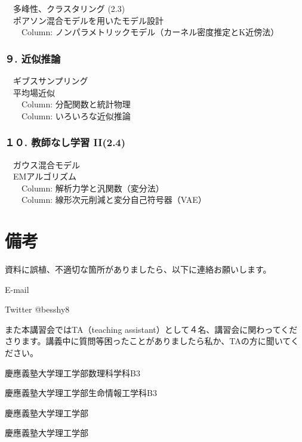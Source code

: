 \documentclass[
]{ltjarticle}
\begin{document}
　多峰性、クラスタリング (2.3)\\
　ポアソン混合モデルを用いたモデル設計\\
　　Column: ノンパラメトリックモデル（カーネル密度推定とK近傍法）

\hypertarget{ux8fd1ux4f3cux63a8ux8ad6}{%
\subsubsection{９. 近似推論}\label{ux8fd1ux4f3cux63a8ux8ad6}}

　ギブスサンプリング\\
　平均場近似\\
　　Column: 分配関数と統計物理\\
　　Column: いろいろな近似推論

\hypertarget{ux6559ux5e2bux306aux3057ux5b66ux7fd2-ii2.4}{%
\subsubsection{１０. 教師なし学習
II(2.4)}\label{ux6559ux5e2bux306aux3057ux5b66ux7fd2-ii2.4}}

　ガウス混合モデル\\
　EMアルゴリズム\\
　　Column: 解析力学と汎関数（変分法）\\
　　Column: 線形次元削減と変分自己符号器（VAE）

\hypertarget{ux5099ux8003}{%
\section{備考}\label{ux5099ux8003}}

資料に誤植、不適切な箇所がありましたら、以下に連絡お願いします。

E-mail

Twitter @besshy8

また本講習会ではTA（teaching assistant）として４名、講習会に関わってくだ
さります。講義中に質問等困ったことがありましたら私か、TAの方に聞いてください。

慶應義塾大学理工学部数理科学科B3

慶應義塾大学理工学部生命情報工学科B3

慶應義塾大学理工学部

慶應義塾大学理工学部
\end{document}
